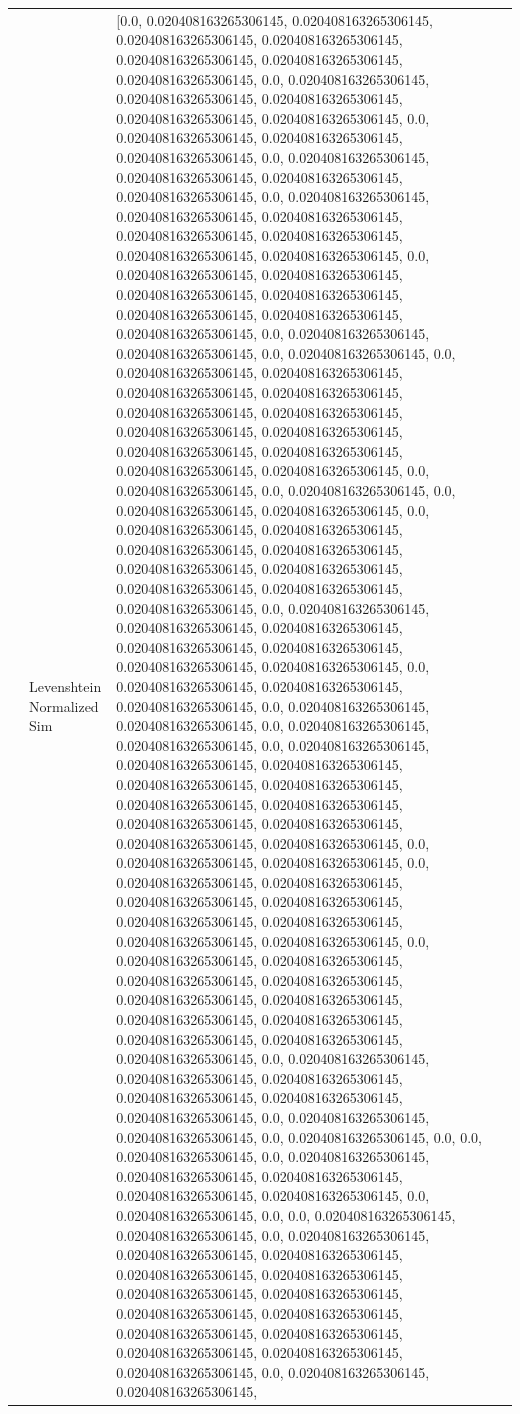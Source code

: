 \begin{tabular}{llll}
 & Levenshtein Normalized Sim & [0.0, 0.020408163265306145, 0.020408163265306145, 0.020408163265306145, 0.020408163265306145, 0.020408163265306145, 0.020408163265306145, 0.020408163265306145, 0.0, 0.020408163265306145, 0.020408163265306145, 0.020408163265306145, 0.020408163265306145, 0.020408163265306145, 0.0, 0.020408163265306145, 0.020408163265306145, 0.020408163265306145, 0.0, 0.020408163265306145, 0.020408163265306145, 0.020408163265306145, 0.020408163265306145, 0.0, 0.020408163265306145, 0.020408163265306145, 0.020408163265306145, 0.020408163265306145, 0.020408163265306145, 0.020408163265306145, 0.020408163265306145, 0.0, 0.020408163265306145, 0.020408163265306145, 0.020408163265306145, 0.020408163265306145, 0.020408163265306145, 0.020408163265306145, 0.020408163265306145, 0.0, 0.020408163265306145, 0.020408163265306145, 0.0, 0.020408163265306145, 0.0, 0.020408163265306145, 0.020408163265306145, 0.020408163265306145, 0.020408163265306145, 0.020408163265306145, 0.020408163265306145, 0.020408163265306145, 0.020408163265306145, 0.020408163265306145, 0.020408163265306145, 0.020408163265306145, 0.020408163265306145, 0.0, 0.020408163265306145, 0.0, 0.020408163265306145, 0.0, 0.020408163265306145, 0.020408163265306145, 0.0, 0.020408163265306145, 0.020408163265306145, 0.020408163265306145, 0.020408163265306145, 0.020408163265306145, 0.020408163265306145, 0.020408163265306145, 0.020408163265306145, 0.020408163265306145, 0.0, 0.020408163265306145, 0.020408163265306145, 0.020408163265306145, 0.020408163265306145, 0.020408163265306145, 0.020408163265306145, 0.020408163265306145, 0.0, 0.020408163265306145, 0.020408163265306145, 0.020408163265306145, 0.0, 0.020408163265306145, 0.020408163265306145, 0.0, 0.020408163265306145, 0.020408163265306145, 0.0, 0.020408163265306145, 0.020408163265306145, 0.020408163265306145, 0.020408163265306145, 0.020408163265306145, 0.020408163265306145, 0.020408163265306145, 0.020408163265306145, 0.020408163265306145, 0.020408163265306145, 0.020408163265306145, 0.0, 0.020408163265306145, 0.020408163265306145, 0.0, 0.020408163265306145, 0.020408163265306145, 0.020408163265306145, 0.020408163265306145, 0.020408163265306145, 0.020408163265306145, 0.020408163265306145, 0.020408163265306145, 0.0, 0.020408163265306145, 0.020408163265306145, 0.020408163265306145, 0.020408163265306145, 0.020408163265306145, 0.020408163265306145, 0.020408163265306145, 0.020408163265306145, 0.020408163265306145, 0.020408163265306145, 0.020408163265306145, 0.0, 0.020408163265306145, 0.020408163265306145, 0.020408163265306145, 0.020408163265306145, 0.020408163265306145, 0.020408163265306145, 0.0, 0.020408163265306145, 0.020408163265306145, 0.0, 0.020408163265306145, 0.0, 0.0, 0.020408163265306145, 0.0, 0.020408163265306145, 0.020408163265306145, 0.020408163265306145, 0.020408163265306145, 0.020408163265306145, 0.0, 0.020408163265306145, 0.0, 0.0, 0.020408163265306145, 0.020408163265306145, 0.0, 0.020408163265306145, 0.020408163265306145, 0.020408163265306145, 0.020408163265306145, 0.020408163265306145, 0.020408163265306145, 0.020408163265306145, 0.020408163265306145, 0.020408163265306145, 0.020408163265306145, 0.020408163265306145, 0.020408163265306145, 0.020408163265306145, 0.020408163265306145, 0.0, 0.020408163265306145, 0.020408163265306145, 
\end{tabular}

